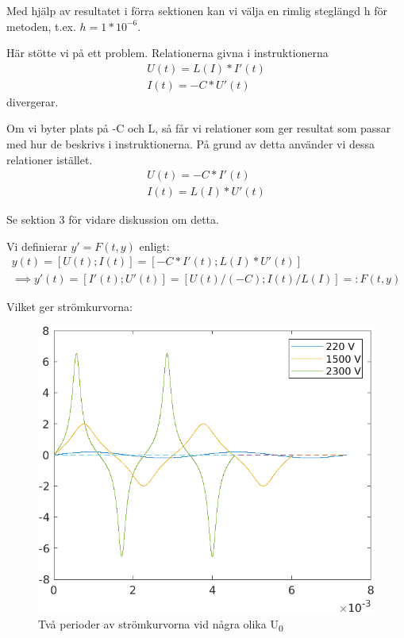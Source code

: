 \documentclass[a4paper, titlepage, 11pt]{article}
\begin{document}
Med hjälp av resultatet i förra sektionen kan vi välja en rimlig steglängd h för metoden, t.ex.
$h = 1*10^{-6}$.


Här stötte vi på ett problem. Relationerna givna i instruktionerna
\begin{gather*}
    U(t) = L(I) * I'(t) \\
    I(t) = -C * U'(t)
\end{gather*}
divergerar.

Om vi byter plats på -C och L, så får vi relationer som ger resultat som passar med hur de beskrivs i instruktionerna. På grund av detta använder vi dessa relationer istället. 
\begin{gather*}
    U(t) = -C * I'(t) \\
    I(t) = L(I) * U'(t)
\end{gather*}

Se sektion 3 för vidare diskussion om detta.

Vi definierar $y' = F(t, y)$ enligt:
\begin{gather*}
 y(t) = [U(t); I(t)] = [-C * I'(t); L(I) * U'(t)] \\
 \implies y'(t) = [I'(t); U'(t)] = [U(t)/(-C); I(t)/L(I)] =: F(t, y)
\end{gather*}

Vilket ger strömkurvorna:

\begin{figure}[H]
  \includegraphics[width=\linewidth]{currents3.png}
  \caption{Två perioder av strömkurvorna vid några olika U\textsubscript{0}}
\end{figure}
\end{document}
